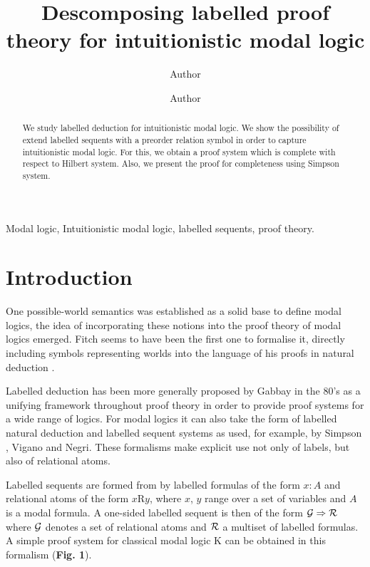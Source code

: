 \documentclass[twoside]{aiml18}
\begin{document}
\begin{frontmatter}
  \title{Descomposing labelled proof theory for intuitionistic modal logic}
  \author{Author}
  \address{Affiliation \\ Address }
 \author{Author}
 \address{Affiliation \\ Address \\ Address}
  
  \begin{abstract}
  We study labelled deduction for intuitionistic modal logic. We show the possibility of extend labelled sequents with a preorder relation symbol in order to capture intuitionistic modal logic. For this, we obtain a proof system which is complete with respect to Hilbert system.  Also, we present the proof for completeness using Simpson system.
  \end{abstract}

  \begin{keyword}
  Modal logic, Intuitionistic modal logic, labelled sequents, proof theory.
  \end{keyword}
 \end{frontmatter}


\section{Introduction}
One possible-world semantics was established as a solid base to define modal logics, the idea of incorporating these notions into the proof theory of modal logics emerged. Fitch seems to have been the first one to formalise it, directly including symbols representing worlds into the language of his proofs in natural deduction \cite{Fitch}.

Labelled deduction has been more generally proposed by Gabbay in the 80’s as a unifying framework throughout proof theory in order to provide proof systems for a wide range of logics. For modal logics it can also take the form of labelled natural deduction and labelled sequent systems as used, for example, by Simpson \cite{Simpson}, Vigano \cite{Vigano} and Negri\cite{Negri}. These formalisms make explicit use not only of labels, but also of relational atoms. 

Labelled sequents are formed from by labelled formulas of the form $x \colon A$  and relational atoms of the form $x$R$y$, where $x$, $y$ range over a set of variables and $A$ is a modal formula. A one-sided labelled sequent is then of the form $\mathcal{G} \Rightarrow \mathcal{R}$ where $\mathcal{G}$ denotes a set of relational atoms and $\mathcal{R}$ a multiset of labelled formulas. A simple proof system for classical modal logic K can be obtained in this formalism (\textbf{Fig. 1}). 
\end{document}
